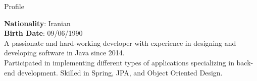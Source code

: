 
\begin{jrsection}[location = sidebar]{Profile}
    \begin{jrdescription}
        {\bfseries Nationality}: Iranian \\
        {\bfseries Birth Date}: 09/06/1990 \\
    A passionate and hard-working developer with experience in designing and developing software in Java since 2014.\\
    Participated in implementing different types of applications specializing in back-end development.
    Skilled in Spring, JPA, and Object Oriented Design.
    \end{jrdescription}
\end{jrsection}
